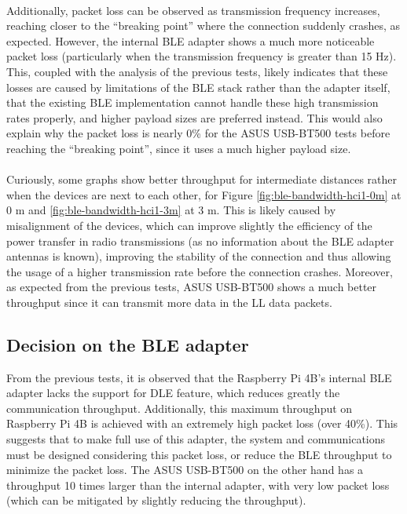\paragraph{} Additionally, packet loss can be observed as transmission frequency increases, reaching closer to the ``breaking point'' where the connection suddenly crashes, as expected. However, the internal \acs{BLE} adapter shows a much more noticeable packet loss (particularly when the transmission frequency is greater than 15 Hz). This, coupled with the analysis of the previous tests, likely indicates that these losses are caused by limitations of the \acs{BLE} stack rather than the adapter itself, that the existing \acs*{BLE} implementation cannot handle these high transmission rates properly, and higher payload sizes are preferred instead. This would also explain why the packet loss is nearly 0\% for the ASUS USB-BT500 tests before reaching the ``breaking point'', since it uses a much higher payload size.

\paragraph{} Curiously, some graphs show better throughput for intermediate distances rather when the devices are next to each other,  for Figure \ref{fig:ble-bandwidth-hci1-0m} at 0 m and \ref{fig:ble-bandwidth-hci1-3m} at 3 m. This is likely caused by misalignment of the devices, which can improve slightly the efficiency of the power transfer in radio transmissions (as no information about the \acs{BLE} adapter antennas is known), improving the stability of the connection and thus allowing the usage of a higher transmission rate before the connection crashes. Moreover, as expected from the previous tests, ASUS USB-BT500 shows a much better throughput since it can transmit more data in the \acs{LL} data packets. 

\subsection{Decision on the \acs{BLE} adapter}

From the previous tests, it is observed that the Raspberry Pi 4B's internal \acs{BLE} adapter lacks the support for \acs{DLE} feature, which reduces greatly the communication throughput. Additionally, this maximum throughput on Raspberry Pi 4B is achieved with an extremely high packet loss (over 40\%). This suggests that to make full use of this adapter, the system and communications must be designed considering this packet loss, or reduce the \acs{BLE} throughput to minimize the packet loss. The ASUS USB-BT500 on the other hand has a throughput 10 times larger than the internal adapter, with very low packet loss (which can be mitigated by slightly reducing the throughput).

